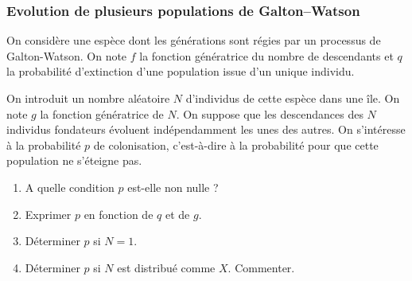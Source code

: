 \subsubsection{Evolution de plusieurs populations de Galton–Watson}

On considère une espèce dont les générations sont régies par un processus de Galton-Watson. On note $f$ la fonction génératrice du nombre de descendants et $q$ la probabilité d'extinction d'une population issue d'un unique individu.

On introduit un nombre aléatoire $N$ d'individus de cette espèce dans une île. On note $g$ la fonction génératrice de $N$. On suppose que les descendances des $N$ individus fondateurs évoluent indépendamment les unes des autres. On s'intéresse à la probabilité $p$ de colonisation, c'est-à-dire à la probabilité pour que cette population ne s'éteigne pas.
\begin{enumerate}
  \item A quelle condition $p$ est-elle non nulle ?
  \item Exprimer $p$ en fonction de $q$ et de $g$. 
  \item Déterminer $p$ si $N = 1$.
  \item Déterminer $p$ si $N$ est distribué comme $X$. 
  Commenter.
\end{enumerate}

